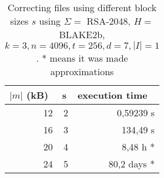 \begin{table}[ht]
\centering
\begin{tabular}{rrr}
\hline
\multicolumn{1}{|l|}{\textbf{$|m|$ (kB)}} & \multicolumn{1}{l|}{\textbf{s}} & \multicolumn{1}{l|}{\textbf{execution time}} \\ \hline
12                                      & 2                               & 0,59239 s                                    \\
16                                      & 3                               & 134,49 s                                     \\
20                                      & 4                               & 8,48 h *                                     \\
24                                      & 5                               & 80,2 days *                                 
\end{tabular}
    \caption{Correcting files using different block sizes $s$ using $\Sigma =$ RSA-2048, $H =$ BLAKE2b, $k = 3, n = 4096, t = 256, d = 7, |I| = 1$. * means it was made approximations}
    \label{table:correction-different-s}
\end{table}